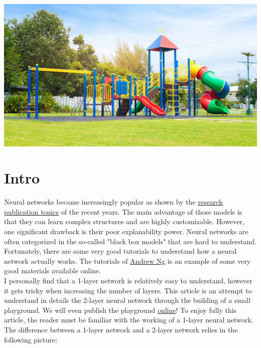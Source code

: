 \begin{center}
\includegraphics[scale=0.25]{img/playground.png}
\end{center}

\section{Intro}

Neural networks became increasingly popular as shown by the \href{https://www.kdnuggets.com/wp-content/uploads/Fig2-winning-machine-learning-competition.jpg}{research publication topics} of the recent years. The main advantage of those models is that they can learn complex structures and are highly customizable. However, one significant drawback is their poor explanability power. Neural networks are often categorized in the so-called "black box models" that are hard to understand.
Fortunately, there are some very good tutorials to understand how a neural network actually works. The tutorials of \href{https://www.coursera.org/learn/neural-networks-deep-learning}{Andrew Ng} is an example of some very good materials available online. \\

I personally find that a 1-layer network is relatively easy to understand, however it gets tricky when increasing the number of layers. This article is an attempt to understand in details the 2-layer neural network through the building of a small playground. We will even publish the playground \href{https://nn-playground-app.herokuapp.com/}{online}! To enjoy fully this article, the reader must be familiar with the working of a 1-layer neural network.\\

The difference between a 1-layer network and a 2-layer network relies in the following picture: \\

